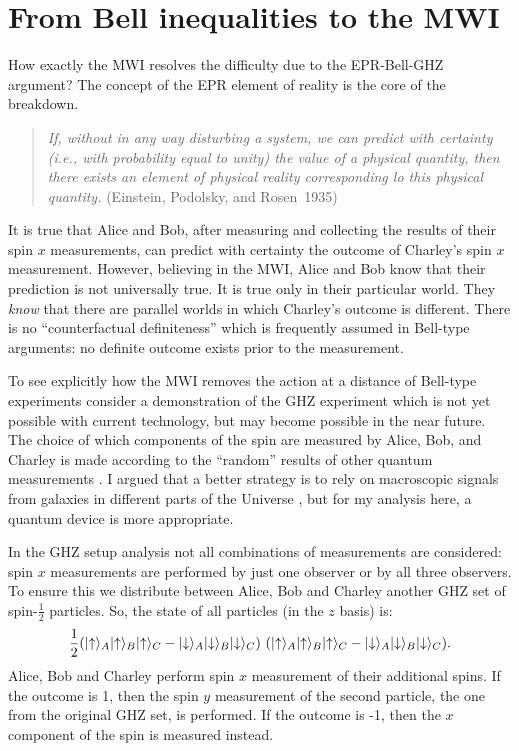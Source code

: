 \documentclass[12pt]{article}
\begin{document}
\section{From Bell inequalities to the MWI }

How exactly the MWI resolves the difficulty due to the EPR-Bell-GHZ argument? The concept of the EPR element of reality is the core of the breakdown.
\begin{quote}
{\it   If, without in any way disturbing a system, we can predict with certainty (i.e., with
probability equal to unity) the value of a physical quantity, then there exists an element of physical reality corresponding lo this physical quantity.}
\flushright
 (Einstein, Podolsky, and Rosen~1935)
\end{quote}
 It is true that Alice and Bob, after measuring and collecting the results of their  spin $x$ measurements, can predict with certainty the outcome of Charley's spin $x$ measurement. However,  believing in the MWI, Alice and Bob know that their prediction is not universally true. It is true only in their particular world. They {\it know} that there are  parallel worlds in which Charley's outcome is different. There is  no ``counterfactual definiteness'' which is frequently assumed in Bell-type arguments: no definite outcome   exists  prior to the measurement.


To see explicitly how the MWI removes the action at a distance of Bell-type experiments consider a demonstration of the GHZ experiment which is not yet possible with current technology, but may become possible in the near future. The choice of which components of the spin are measured  by Alice, Bob, and Charley  is made according to the ``random''  results of other quantum measurements \cite{Sheid}.   I argued that a better strategy is to rely  on macroscopic signals from galaxies in different parts of the Universe \cite{VBell}, but for my analysis here, a quantum device is more appropriate.

In the GHZ setup analysis not all combinations of measurements are considered: spin $x$ measurements are performed by just one  observer or by all three observers. To ensure this we distribute between Alice, Bob and Charley another GHZ set of  spin-$\frac{1}{2}$ particles. So, the state of all particles  (in the $z$ basis) is:
\begin{equation}
\label{GHZ+}
  {1\over
  2}{\Large (}|{\uparrow}\rangle_A|{\uparrow}\rangle_B|{\uparrow}\rangle_C -
|{\downarrow}\rangle_A|{\downarrow}\rangle_B|{\downarrow}\rangle_C{\Large
)}~{\Large (}|{\uparrow}\rangle_A|{\uparrow}\rangle_B|{\uparrow}\rangle_C -
|{\downarrow}\rangle_A|{\downarrow}\rangle_B|{\downarrow}\rangle_C{\Large
)} .
\end{equation}
Alice, Bob and Charley perform spin $x$ measurement of their additional spins. If the outcome is 1,  then the spin $y$ measurement of the second particle, the one from the original GHZ set, is performed. If the outcome is -1, then the   $x$ component of the spin is measured instead.
\end{document}
